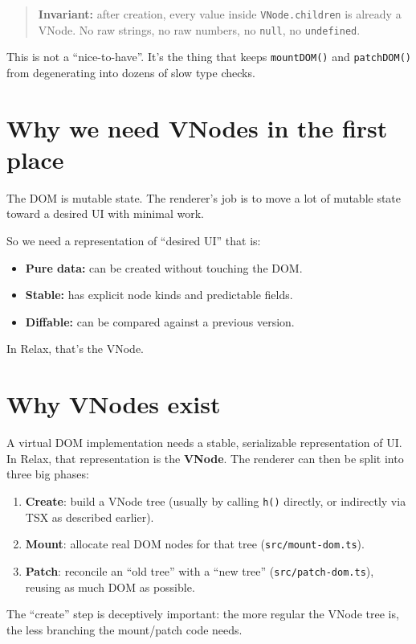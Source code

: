 \begin{quote}
  \noindent\textbf{Invariant:} after creation, every value inside \texttt{VNode.children} is already a VNode.
  No raw strings, no raw numbers, no \texttt{null}, no \texttt{undefined}.
\end{quote}

This is not a ``nice-to-have''.
It's the thing that keeps \texttt{mountDOM()} and \texttt{patchDOM()} from degenerating into dozens of slow type checks.

\section{Why we need VNodes in the first place}
The DOM is mutable state.
The renderer's job is to move a lot of mutable state toward a desired UI with minimal work.

So we need a representation of ``desired UI'' that is:

\begin{itemize}
  \item \textbf{Pure data:} can be created without touching the DOM.
  \item \textbf{Stable:} has explicit node kinds and predictable fields.
  \item \textbf{Diffable:} can be compared against a previous version.
\end{itemize}

In Relax, that's the VNode.

\section{Why VNodes exist}
A virtual DOM implementation needs a stable, serializable representation of UI. In Relax, that representation is the \textbf{VNode}. The renderer can then be split into three big phases:

\begin{enumerate}
  \item \textbf{Create}: build a VNode tree (usually by calling \texttt{h()} directly, or indirectly via TSX as described earlier).
  \item \textbf{Mount}: allocate real DOM nodes for that tree (\texttt{src/mount-dom.ts}).
  \item \textbf{Patch}: reconcile an ``old tree'' with a ``new tree'' (\texttt{src/patch-dom.ts}), reusing as much DOM as possible.
\end{enumerate}

The ``create'' step is deceptively important: the more regular the VNode tree is, the less branching the mount/patch code needs.

